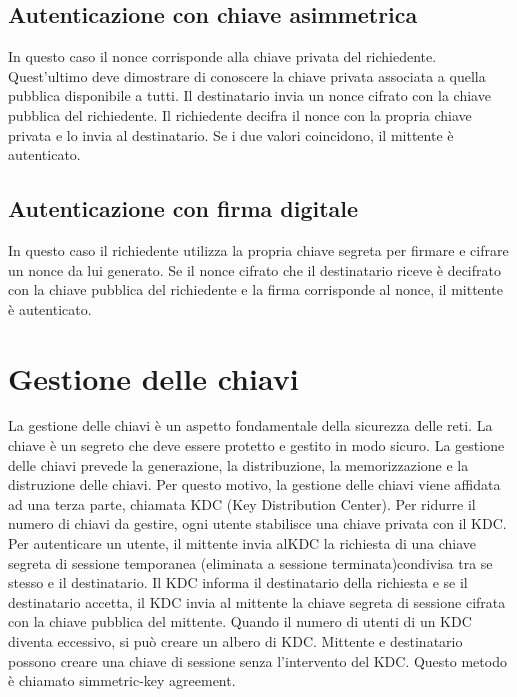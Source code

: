 \documentclass[12pt]{report}
\begin{document}
\subsection{Autenticazione con chiave asimmetrica}
In questo caso il nonce corrisponde alla chiave privata del richiedente. Quest'ultimo deve dimostrare di conoscere la chiave privata associata a quella pubblica disponibile a tutti. Il destinatario invia un nonce cifrato con la chiave pubblica del richiedente. Il richiedente decifra il nonce con la propria chiave privata e lo invia al destinatario. Se i due valori coincidono, il mittente è autenticato.

\subsection{Autenticazione con firma digitale}
In questo caso il richiedente utilizza la propria chiave segreta per firmare e cifrare un nonce da lui generato. Se il nonce cifrato che il destinatario riceve è decifrato con la chiave pubblica del richiedente e la firma corrisponde al nonce, il mittente è autenticato.

\section{Gestione delle chiavi}
La gestione delle chiavi è un aspetto fondamentale della sicurezza delle reti. La chiave è un segreto che deve essere protetto e gestito in modo sicuro. La gestione delle chiavi prevede la generazione, la distribuzione, la memorizzazione e la distruzione delle chiavi. Per questo motivo, la gestione delle chiavi viene affidata ad una terza parte, chiamata KDC (Key Distribution Center). Per ridurre il numero di chiavi da gestire, ogni utente stabilisce una chiave privata con il KDC. Per autenticare un utente, il mittente invia alKDC la richiesta di una chiave segreta di sessione temporanea (eliminata a sessione terminata)condivisa tra se stesso e il destinatario. Il KDC informa il destinatario della richiesta e se il destinatario accetta, il KDC invia al mittente la chiave segreta di sessione cifrata con la chiave pubblica del mittente. Quando il numero di utenti di un KDC diventa eccessivo, si può creare un albero di KDC. Mittente e destinatario possono creare una chiave di sessione senza l'intervento del KDC. Questo metodo è chiamato simmetric-key agreement.
\end{document}
